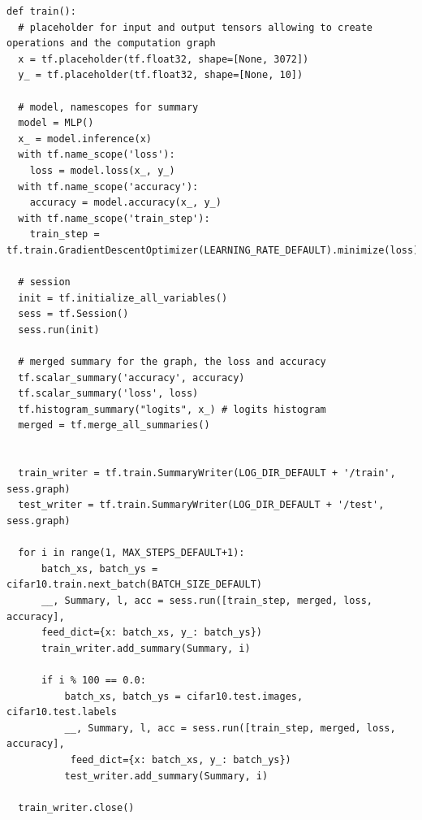\documentclass{article}
\begin{document}
\begin{small}
\begin{verbatim}
def train():
  # placeholder for input and output tensors allowing to create operations and the computation graph
  x = tf.placeholder(tf.float32, shape=[None, 3072])
  y_ = tf.placeholder(tf.float32, shape=[None, 10])
  
  # model, namescopes for summary
  model = MLP()
  x_ = model.inference(x)
  with tf.name_scope('loss'):
    loss = model.loss(x_, y_)
  with tf.name_scope('accuracy'):
    accuracy = model.accuracy(x_, y_)
  with tf.name_scope('train_step'):
    train_step = tf.train.GradientDescentOptimizer(LEARNING_RATE_DEFAULT).minimize(loss)
  
  # session
  init = tf.initialize_all_variables()
  sess = tf.Session()
  sess.run(init)

  # merged summary for the graph, the loss and accuracy
  tf.scalar_summary('accuracy', accuracy)
  tf.scalar_summary('loss', loss)
  tf.histogram_summary("logits", x_) # logits histogram
  merged = tf.merge_all_summaries()


  train_writer = tf.train.SummaryWriter(LOG_DIR_DEFAULT + '/train', sess.graph)
  test_writer = tf.train.SummaryWriter(LOG_DIR_DEFAULT + '/test', sess.graph)

  for i in range(1, MAX_STEPS_DEFAULT+1):
      batch_xs, batch_ys = cifar10.train.next_batch(BATCH_SIZE_DEFAULT)
      __, Summary, l, acc = sess.run([train_step, merged, loss, accuracy],
      feed_dict={x: batch_xs, y_: batch_ys})
      train_writer.add_summary(Summary, i)

      if i % 100 == 0.0:
          batch_xs, batch_ys = cifar10.test.images, cifar10.test.labels
          __, Summary, l, acc = sess.run([train_step, merged, loss, accuracy],
           feed_dict={x: batch_xs, y_: batch_ys})
          test_writer.add_summary(Summary, i)

  train_writer.close()
\end{verbatim}
\end{small}
\end{document}
